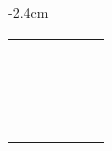\begin{center}
\begin{adjustwidth}{-2.4cm}{}
\begin{tabular}{|c c c c c c|}
             &  &  &  &  &  \\
             &  &  &  &  &  \\
             &  &  &  &  &  \\
             &  &  &  &  &  \\
             &  &  &  &  &  \\
             &  &  &  &  &  \\
             &  &  &  &  &  \\
             &  &  &  &  &  \\
             &  &  &  &  &  \\
             &  &  &  &  &  \\
             &  &  &  &  &  \\
             &  &  &  &  &  \\
             &  &  &  &  &  \\
             &  &  &  &  &  \\
             &  &  &  &  &  \\
             &  &  &  &  &  \\
             &  &  &  &  &  \\
            \hline
        \end{tabular}
    \end{adjustwidth}
\end{center}

